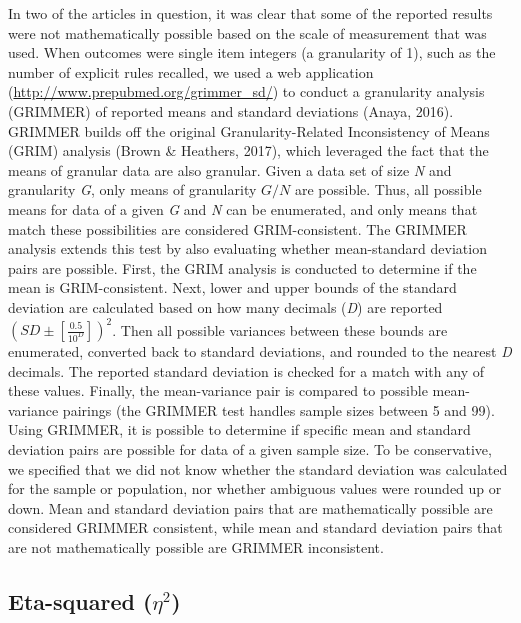 \documentclass[
  english,
  man, donotrepeattitle,floatsintext]{apa7}
\begin{document}
In two of the articles in question, it was clear that some of the reported results were not mathematically possible based on the scale of measurement that was used. When outcomes were single item integers (a granularity of 1), such as the number of explicit rules recalled, we used a web application (\url{http://www.prepubmed.org/grimmer_sd/}) to conduct a granularity analysis (GRIMMER) of reported means and standard deviations (Anaya, 2016). GRIMMER builds off the original Granularity-Related Inconsistency of Means (GRIM) analysis (Brown \& Heathers, 2017), which leveraged the fact that the means of granular data are also granular. Given a data set of size \emph{N} and granularity \emph{G}, only means of granularity \(G/N\) are possible. Thus, all possible means for data of a given \emph{G} and \emph{N} can be enumerated, and only means that match these possibilities are considered GRIM-consistent. The GRIMMER analysis extends this test by also evaluating whether mean-standard deviation pairs are possible. First, the GRIM analysis is conducted to determine if the mean is GRIM-consistent. Next, lower and upper bounds of the standard deviation are calculated based on how many decimals (\emph{D}) are reported \((SD\pm[\frac{0.5}{10^{D}}])^{2}\). Then all possible variances between these bounds are enumerated, converted back to standard deviations, and rounded to the nearest \emph{D} decimals. The reported standard deviation is checked for a match with any of these values. Finally, the mean-variance pair is compared to possible mean-variance pairings (the GRIMMER test handles sample sizes between 5 and 99). Using GRIMMER, it is possible to determine if specific mean and standard deviation pairs are possible for data of a given sample size. To be conservative, we specified that we did not know whether the standard deviation was calculated for the sample or population, nor whether ambiguous values were rounded up or down. Mean and standard deviation pairs that are mathematically possible are considered GRIMMER consistent, while mean and standard deviation pairs that are not mathematically possible are GRIMMER inconsistent.

\hypertarget{eta-squared-eta2}{%
\subsection{\texorpdfstring{Eta-squared (\(\eta^{2}\))}{Eta-squared (\textbackslash eta\^{}\{2\})}}\label{eta-squared-eta2}}
\end{document}
